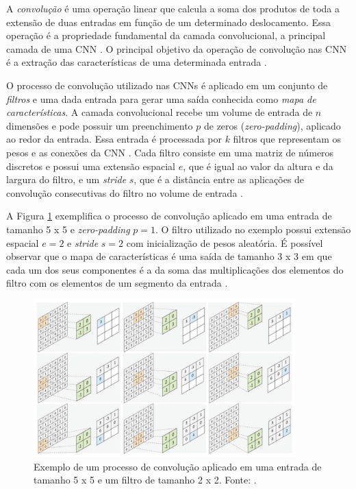 A \textit{convolução} é uma operação linear que calcula a soma dos produtos de toda a extensão de duas entradas em função de um determinado deslocamento. Essa operação é a propriedade fundamental da camada convolucional, a principal camada de uma CNN \cite{ref:goodfellow}.  O principal objetivo da operação de convolução nas CNN é a extração das características de uma determinada entrada \cite{ref:sewak}. 

O processo de convolução utilizado nas CNNs é aplicado em um conjunto de \textit{filtros} e uma dada entrada para gerar uma saída conhecida como \textit{mapa de características}. A camada convolucional recebe um volume de entrada de $n$ dimensões e pode possuir um preenchimento  $p$ de zeros (\textit{zero-padding}), aplicado ao redor da entrada. Essa entrada é processada por $k$ filtros que representam os pesos e as conexões da CNN \cite{ref:khan}. Cada filtro consiste em uma matriz de números discretos e possui uma extensão espacial $e$, que é igual ao valor da altura e da largura do filtro, e um \textit{stride} $s$, que é a distância entre as aplicações de convolução consecutivas do filtro no volume de entrada \cite{ref:buduma}. 

A Figura \ref{img:convolucao} exemplifica o processo de convolução aplicado em uma entrada de tamanho 5 x 5 e \textit{zero-padding} $p = 1$. O filtro utilizado no exemplo possui extensão espacial $e = 2$ e \textit{stride} $s = 2$ com inicialização de pesos aleatória. É possível observar que o mapa de características é uma saída de tamanho 3 x 3 em que cada um dos seus componentes é a da soma das multiplicações dos elementos do filtro com os elementos de um segmento da entrada \cite{ref:khan}.

\begin{figure}[!ht]
	\centering
	\includegraphics[width=0.9\textwidth]{./img/convolucao}
	\caption{Exemplo de um processo de convolução aplicado em uma entrada de tamanho 5 x 5 e um filtro de tamanho 2 x 2. Fonte: \cite{ref:khan}.}
	\label{img:convolucao}
\end{figure}


